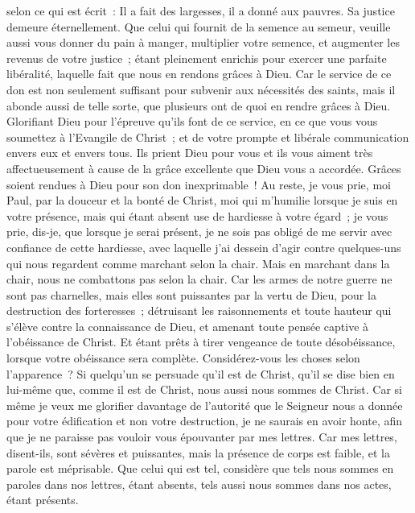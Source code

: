 \begin{multicols}{2}
selon ce qui est écrit~: Il a fait des largesses, il a donné aux pauvres. Sa justice demeure éternellement.
Que celui qui fournit de la semence au semeur, veuille aussi vous donner du pain à manger, multiplier votre semence, et augmenter les revenus de votre justice~;
étant pleinement enrichis pour exercer une parfaite libéralité, laquelle fait que nous en rendons grâces à Dieu.
Car le service de ce don est non seulement suffisant pour subvenir aux nécessités des saints, mais il abonde aussi de telle sorte, que plusieurs ont de quoi en rendre grâces à Dieu.
Glorifiant Dieu pour l'épreuve qu'ils font de ce service, en ce que vous vous soumettez à l'Evangile de Christ~; et de votre prompte et libérale communication envers eux et envers tous.
Ils prient Dieu pour vous et ils vous aiment très affectueusement à cause de la grâce excellente que Dieu vous a accordée.
Grâces soient rendues à Dieu pour son don inexprimable~!
\VerseOne{}Au reste, je vous prie, moi Paul, par la douceur et la bonté de Christ, moi qui m'humilie lorsque je suis en votre présence, mais qui étant absent use de hardiesse à votre égard~;
je vous prie, dis-je, que lorsque je serai présent, je ne sois pas obligé de me servir avec confiance de cette hardiesse, avec laquelle j'ai dessein d'agir contre quelques-uns qui nous regardent comme marchant selon la chair.
Mais en marchant dans la chair, nous ne combattons pas selon la chair.
Car les armes de notre guerre ne sont pas charnelles, mais elles sont puissantes par la vertu de Dieu, pour la destruction des forteresses~;
détruisant les raisonnements et toute hauteur qui s'élève contre la connaissance de Dieu, et amenant toute pensée captive à l'obéissance de Christ.
Et étant prêts à tirer vengeance de toute désobéissance, lorsque votre obéissance sera complète.
Considérez-vous les choses selon l'apparence~? Si quelqu'un se persuade qu'il est de Christ, qu'il se dise bien en lui-même que, comme il est de Christ, nous aussi nous sommes de Christ.
Car si même je veux me glorifier davantage de l'autorité que le Seigneur nous a donnée pour votre édification et non votre destruction, je ne saurais en avoir honte,
afin que je ne paraisse pas vouloir vous épouvanter par mes lettres.
Car mes lettres, disent-ils, sont sévères et puissantes, mais la présence de corps est faible, et la parole est méprisable.
Que celui qui est tel, considère que tels nous sommes en paroles dans nos lettres, étant absents, tels aussi nous sommes dans nos actes, étant présents.

\end{multicols}
